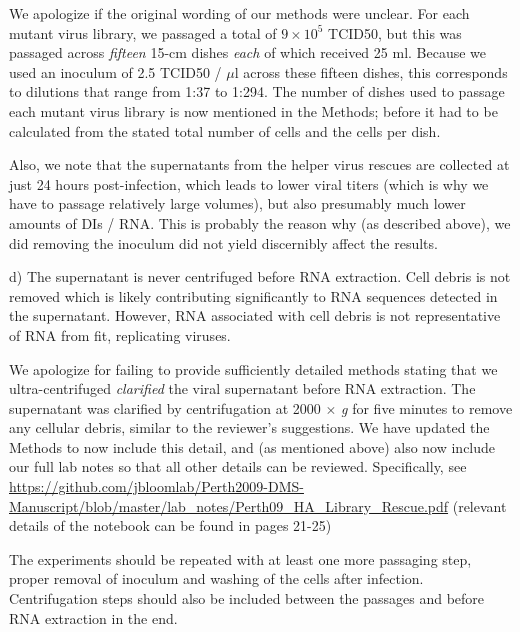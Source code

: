 \documentclass[11pt, oneside]{article}   	%
\newcommand{\response}[1]{{\color{black}#1}}
\begin{document}
\response{
We apologize if the original wording of our methods were unclear. 
For each mutant virus library, we passaged a total of $9\times10^5$ TCID50, but this was passaged across \emph{fifteen} 15-cm dishes \emph{each} of which received 25 ml.
Because we used an inoculum of 2.5 TCID50 / $\mu$l across these fifteen dishes, this corresponds to dilutions that range from 1:37 to 1:294.
The number of dishes used to passage each mutant virus library is now mentioned in the Methods; before it had to be calculated from the stated total number of cells and the cells per dish.

Also, we note that the supernatants from the helper virus rescues are collected at just 24 hours post-infection, which leads to lower viral titers (which is why we have to passage relatively large volumes), but also presumably much lower amounts of DIs / RNA.
This is probably the reason why (as described above), we did removing the inoculum did not yield discernibly affect the results.
}

d) The supernatant is never centrifuged before RNA extraction. Cell debris is not removed which is likely contributing significantly to RNA sequences detected in the supernatant. However, RNA associated with cell debris is not representative of RNA from fit, replicating viruses. 

\response{We apologize for failing to provide sufficiently detailed methods stating that we ultra-centrifuged \emph{clarified} the viral supernatant before RNA extraction.
The supernatant was clarified by centrifugation at 2000 $\times$ \textit{g} for five minutes to remove any cellular debris, similar to the reviewer's suggestions.
We have updated the Methods to now include this detail, and (as mentioned above) also now include our full lab notes so that all other details can be reviewed.
Specifically, see \url{https://github.com/jbloomlab/Perth2009-DMS-Manuscript/blob/master/lab_notes/Perth09_HA_Library_Rescue.pdf} (relevant details of the notebook can be found in pages 21-25)
}

The experiments should be repeated with at least one more passaging step, proper removal of inoculum and washing of the cells after infection. Centrifugation steps should also be included between the passages and before RNA extraction in the end. 
\end{document}
